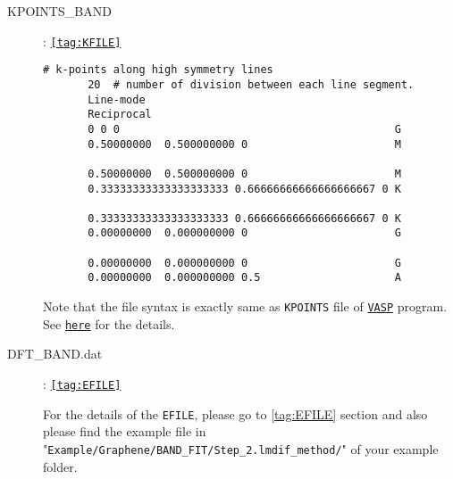 \documentclass[a4paper,12pt]{scrartcl}
\makeatletter
\def\namedlabel#1#2{\begingroup
    #2%
    \def\@currentlabel{#2}%
    \phantomsection\label{#1}\endgroup
}
\makeatother
\begin{document}
\begin{description}
		\item[\namedlabel{tag:KPOINTS}{KPOINTS\_BAND}] : {\texttt{\ref{tag:KFILE}}}			
\begin{Verbatim}[commandchars=\\\{\},gobble=4, frame=single, framesep=2mm, 
    label= example of \ref{tag:KFILE} for Graphene,
    labelposition=bottomline]
     # k-points along high symmetry lines
       20  # number of division between each line segment.
       Line-mode 
       Reciprocal
       0 0 0                                           G
       0.50000000  0.500000000 0                       M
       
       0.50000000  0.500000000 0                       M
       0.33333333333333333333 0.66666666666666666667 0 K
       
       0.33333333333333333333 0.66666666666666666667 0 K
       0.00000000  0.000000000 0                       G
       
       0.00000000  0.000000000 0                       G
       0.00000000  0.000000000 0.5                     A
\end{Verbatim}
        Note that the file syntax is exactly same as \texttt{KPOINTS} file of 
        \href{https://www.vasp.at}{\texttt{VASP}} program.
        See \href{https://cms.mpi.univie.ac.at/wiki/index.php/KPOINTS}{\texttt{here}} for the details.
        
		\item[\namedlabel{tag:DFT_BAND}{DFT\_BAND.dat}] : {\texttt{\ref{tag:EFILE}}}
		
		For the details of the \texttt{EFILE}, please go to \ref{tag:EFILE} section and also please find the example file in 
		"\texttt{Example/Graphene/BAND\_FIT/Step\_2.lmdif\_method/}" of your example folder.
	
			\end{description}


\clearpage\printindex
\end{document}
